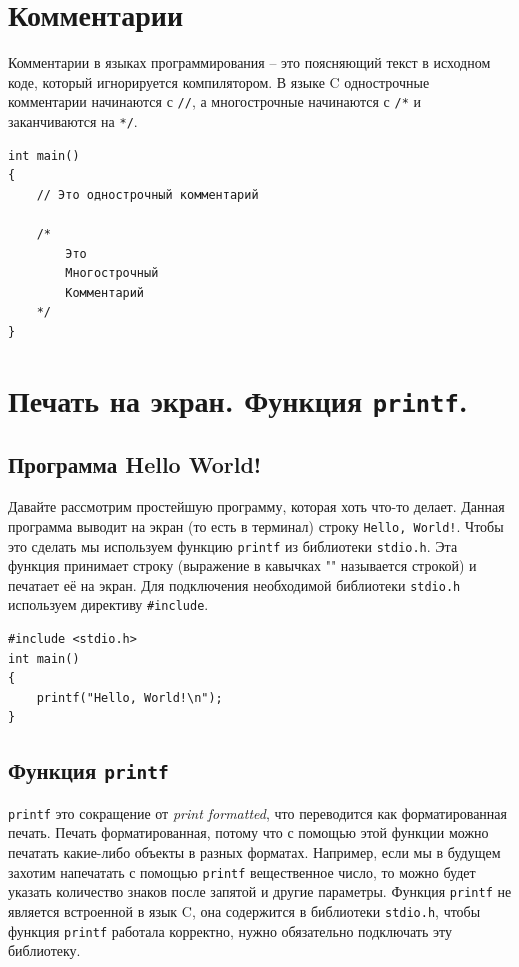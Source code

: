 \documentclass[10pt]{article}
\begin{document}
\section*{Комментарии}
Комментарии в языках программирования -- это поясняющий текст в исходном коде, который игнорируется компилятором. В языке C однострочные комментарии начинаются с \texttt{//}, а многострочные начинаются с \texttt{/*} и заканчиваются на \texttt{*/}.
\begin{lstlisting}
int main() 
{
    // Это однострочный комментарий
    
    /*
    	Это
    	Многострочный
    	Комментарий
    */
}
\end{lstlisting}




\section*{Печать на экран. Функция \texttt{printf}.}
\subsection*{Программа Hello World!}
Давайте рассмотрим простейшую программу, которая хоть что-то делает. Данная программа выводит на экран (то есть в терминал) строку \texttt{Hello, World!}. Чтобы это сделать мы используем функцию \texttt{printf} из библиотеки \texttt{stdio.h}. Эта функция принимает строку (выражение в кавычках "{}"{} называется строкой) и печатает её на экран. Для подключения необходимой библиотеки \texttt{stdio.h} используем директиву \texttt{\#include}.
\begin{lstlisting}
#include <stdio.h>
int main() 
{
    printf("Hello, World!\n");
}
\end{lstlisting}


\subsection*{Функция \texttt{printf}}
\texttt{printf} это сокращение от \textit{print formatted}, что переводится как форматированная печать.
Печать форматированная, потому что с помощью этой функции можно печатать какие-либо объекты в разных форматах.
Например, если мы в будущем захотим напечатать с помощью \texttt{printf} вещественное число, то можно будет
указать количество знаков после запятой и другие параметры. Функция \texttt{printf} не является встроенной в язык C, она содержится в библиотеки \texttt{stdio.h}, чтобы функция \texttt{printf} работала корректно, нужно обязательно подключать эту библиотеку.
\end{document}
